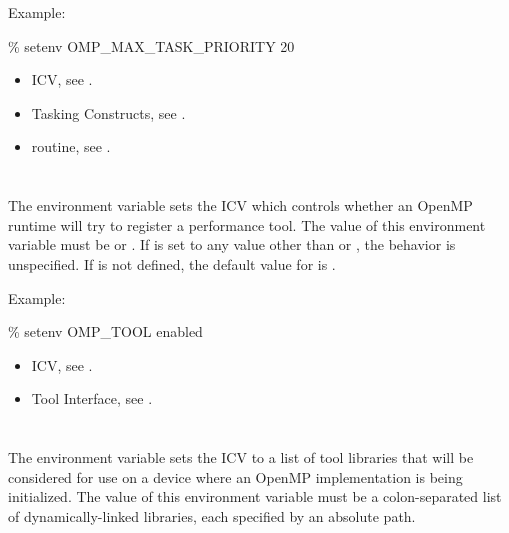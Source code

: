 Example:
\begin{boxedcode}
\% setenv OMP\_MAX\_TASK\_PRIORITY 20
\end{boxedcode}

\crossreferences
\begin{itemize}
\item {} ICV, see .
\item Tasking Constructs, see .
\item {} routine, see .
\end{itemize}


\section{}
\label{sec:OMP_TOOL}

The  environment variable sets the  ICV which controls whether an OpenMP runtime will try to register a performance tool.
The value of this environment variable must be  or .
If  is set to any value other than  or , the behavior is unspecified.
If  is not defined, the default value for  is .

Example:
\begin{boxedcode}
\% setenv OMP\_TOOL enabled
\end{boxedcode}

\crossreferences
\begin{itemize}
\item {} ICV, see .
\item Tool Interface, see .
\end{itemize}




\section{}
\label{sec:OMP_TOOL_LIBRARIES}

The  environment variable sets the
 ICV to a list of tool libraries that will
be considered for use on a device where an OpenMP implementation
is being initialized.  The value of this environment variable must
be a colon-separated list of dynamically-linked libraries, each
specified by an absolute path. 

